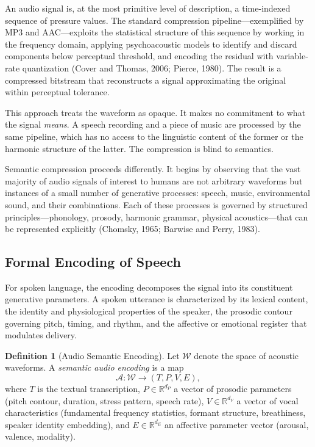 \documentclass[11pt,a4paper]{article}
\theoremstyle{definition}
\newtheorem{definition}[theorem]{Definition}
\theoremstyle{remark}
\begin{document}
An audio signal is, at the most primitive level of description, a time-indexed sequence of pressure values. The standard compression pipeline---exemplified by MP3 and AAC---exploits the statistical structure of this sequence by working in the frequency domain, applying psychoacoustic models to identify and discard components below perceptual threshold, and encoding the residual with variable-rate quantization (Cover and Thomas, 2006; Pierce, 1980). The result is a compressed bitstream that reconstructs a signal approximating the original within perceptual tolerance.

This approach treats the waveform as opaque. It makes no commitment to what the signal \emph{means}. A speech recording and a piece of music are processed by the same pipeline, which has no access to the linguistic content of the former or the harmonic structure of the latter. The compression is blind to semantics.

Semantic compression proceeds differently. It begins by observing that the vast majority of audio signals of interest to humans are not arbitrary waveforms but instances of a small number of generative processes: speech, music, environmental sound, and their combinations. Each of these processes is governed by structured principles---phonology, prosody, harmonic grammar, physical acoustics---that can be represented explicitly (Chomsky, 1965; Barwise and Perry, 1983).

\subsection{Formal Encoding of Speech}

For spoken language, the encoding decomposes the signal into its constituent generative parameters. A spoken utterance is characterized by its lexical content, the identity and physiological properties of the speaker, the prosodic contour governing pitch, timing, and rhythm, and the affective or emotional register that modulates delivery.

\begin{definition}[Audio Semantic Encoding]
Let $\mathcal{W}$ denote the space of acoustic waveforms. A \emph{semantic audio encoding} is a map
\[
\mathcal{A} : \mathcal{W} \rightarrow (T, P, V, E),
\]
where $T$ is the textual transcription, $P \in \mathbb{R}^{d_P}$ a vector of prosodic parameters (pitch contour, duration, stress pattern, speech rate), $V \in \mathbb{R}^{d_V}$ a vector of vocal characteristics (fundamental frequency statistics, formant structure, breathiness, speaker identity embedding), and $E \in \mathbb{R}^{d_E}$ an affective parameter vector (arousal, valence, modality).
\end{definition}
\end{document}
